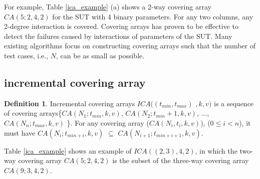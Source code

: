 \documentclass[conference]{IEEEtran}
\theoremstyle{definition}
\newtheorem{definition}{Definition}
\begin{document}
For example, Table \ref{ica_example} (a) shows a 2-way covering array $CA(5;2,4,2)$ for the SUT with 4 binary parameters. For any two columns, any 2-degree interaction is covered.  Covering arrays has proven to be effective to detect the failures caused by interactions of parameters of the SUT. Many existing algorithms focus on constructing covering arrays such that the number of test cases, i.e., $N$, can be as small as possible.


\subsection{incremental covering array}

\begin{definition}
Incremental covering arrays $ICA((t_{min},t_{max})$ $, k, v)$ is a sequence of covering arrays\{$CA(N_{1}; t_{min}, k, v)$, $CA(N_{2}; t_{min} + 1, k, v)$, ..., $CA(N_{n}; t_{max}, k, v)$ \}. For any covering array ($CA(N_{i}, t_{i}, k , v)$), ($ 0 \leq i < n$), it must have $CA(N_{i}; t_{min + i}, k, v)$ $\subseteq$ $CA(N_{i+1}; t_{min + i + 1}, k, v)$.
\end{definition}


Table \ref{ica_example} shows an example of $ICA((2,3), 4, 2)$, in which the two-way covering array $CA(5;2,4,2)$ is the subset of the three-way covering array $CA(9;3,4,2)$.
\end{document}
